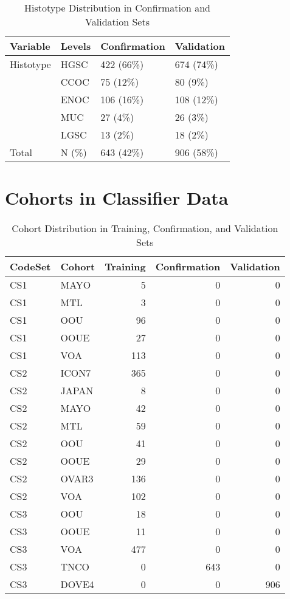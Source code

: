 \documentclass[
]{report}
\begin{document}
\begin{table}

\caption{\label{tab:hist-conf-val}Histotype Distribution in Confirmation and Validation Sets}
\centering
\begin{tabular}[t]{l|l|l|l}
\hline
Variable & Levels & Confirmation & Validation\\
\hline
Histotype & HGSC & 422 (66\%) & 674 (74\%)\\
\hline
 & CCOC & 75 (12\%) & 80 (9\%)\\
\hline
 & ENOC & 106 (16\%) & 108 (12\%)\\
\hline
 & MUC & 27 (4\%) & 26 (3\%)\\
\hline
 & LGSC & 13 (2\%) & 18 (2\%)\\
\hline
Total & N (\%) & 643 (42\%) & 906 (58\%)\\
\hline
\end{tabular}
\end{table}

\hypertarget{cohorts-in-classifier-data}{%
\section{Cohorts in Classifier Data}\label{cohorts-in-classifier-data}}

\begin{table}

\caption{\label{tab:cohort-dist}Cohort Distribution in Training, Confirmation, and Validation Sets}
\centering
\begin{tabular}[t]{l|l|r|r|r}
\hline
CodeSet & Cohort & Training & Confirmation & Validation\\
\hline
CS1 & MAYO & 5 & 0 & 0\\
\hline
CS1 & MTL & 3 & 0 & 0\\
\hline
CS1 & OOU & 96 & 0 & 0\\
\hline
CS1 & OOUE & 27 & 0 & 0\\
\hline
CS1 & VOA & 113 & 0 & 0\\
\hline
CS2 & ICON7 & 365 & 0 & 0\\
\hline
CS2 & JAPAN & 8 & 0 & 0\\
\hline
CS2 & MAYO & 42 & 0 & 0\\
\hline
CS2 & MTL & 59 & 0 & 0\\
\hline
CS2 & OOU & 41 & 0 & 0\\
\hline
CS2 & OOUE & 29 & 0 & 0\\
\hline
CS2 & OVAR3 & 136 & 0 & 0\\
\hline
CS2 & VOA & 102 & 0 & 0\\
\hline
CS3 & OOU & 18 & 0 & 0\\
\hline
CS3 & OOUE & 11 & 0 & 0\\
\hline
CS3 & VOA & 477 & 0 & 0\\
\hline
CS3 & TNCO & 0 & 643 & 0\\
\hline
CS3 & DOVE4 & 0 & 0 & 906\\
\hline
\end{tabular}
\end{table}
\end{document}
